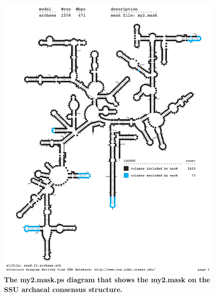 \newpage

\begin{figure}
\begin{center}
\includegraphics[width=5.7in]{Figures/my2-mask}
\end{center}
\caption{\textbf{The my2.mask.ps diagram that shows the my2.mask on
    the SSU archaeal consensus structure.}}
\end{figure}















